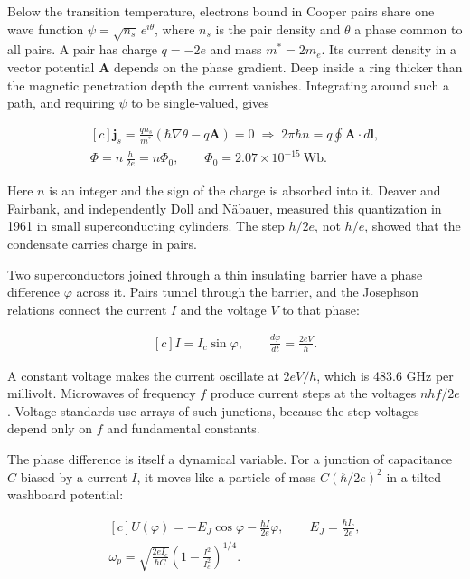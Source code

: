 \documentclass[11pt,oneside]{book}
\newenvironment{centeredalign}{\[\begin{gathered}[c]}{\end{gathered}\]}
\begin{document}
Below the transition temperature, electrons bound in Cooper pairs share one wave function \(\psi=\sqrt{n_s}\,e^{i\theta}\), where \(n_s\) is the pair density and \(\theta\) a phase common to all pairs. A pair has charge \(q=-2e\) and mass \(m^*=2m_e\). Its current density in a vector potential \(\mathbf A\) depends on the phase gradient. Deep inside a ring thicker than the magnetic penetration depth the current vanishes. Integrating around such a path, and requiring \(\psi\) to be single-valued, gives

\begin{centeredalign}
\mathbf j_s=\frac{qn_s}{m^*}\left(\hbar\nabla\theta-q\mathbf A\right)=0
\;\Rightarrow\;2\pi\hbar n=q\oint\mathbf A\cdot d\mathbf l,\\
\Phi=n\,\frac{h}{2e}=n\Phi_0,\qquad \Phi_0=2.07\times10^{-15}\ \mathrm{Wb}.
\end{centeredalign}

Here \(n\) is an integer and the sign of the charge is absorbed into it. Deaver and Fairbank, and independently Doll and Näbauer, measured this quantization in 1961 in small superconducting cylinders. The step \(h/2e\), not \(h/e\), showed that the condensate carries charge in pairs.

Two superconductors joined through a thin insulating barrier have a phase difference \(\varphi\) across it. Pairs tunnel through the barrier, and the Josephson relations connect the current \(I\) and the voltage \(V\) to that phase:

\begin{centeredalign}
I=I_c\sin\varphi,\qquad \frac{d\varphi}{dt}=\frac{2eV}{\hbar}.
\end{centeredalign}

A constant voltage makes the current oscillate at \(2eV/h\), which is 483.6 GHz per millivolt. Microwaves of frequency \(f\) produce current steps at the voltages \(nhf/2e\). Voltage standards use arrays of such junctions, because the step voltages depend only on \(f\) and fundamental constants.

The phase difference is itself a dynamical variable. For a junction of capacitance \(C\) biased by a current \(I\), it moves like a particle of mass \(C(\hbar/2e)^2\) in a tilted washboard potential:

\begin{centeredalign}
U(\varphi)=-E_J\cos\varphi-\frac{\hbar I}{2e}\varphi,\qquad E_J=\frac{\hbar I_c}{2e},\\
\omega_p=\sqrt{\frac{2eI_c}{\hbar C}}\left(1-\frac{I^2}{I_c^2}\right)^{1/4}.
\end{centeredalign}
\end{document}
